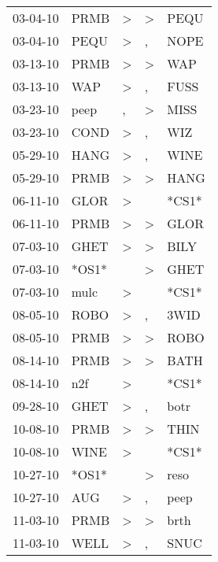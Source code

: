 \begin{supertabular}{lllll}
 03-04-10 &   PRMB &     \textgreater &     \textgreater &   PEQU \\
 03-04-10 &   PEQU &     \textgreater &                , &   NOPE \\
 03-13-10 &   PRMB &     \textgreater &     \textgreater &    WAP \\
 03-13-10 &    WAP &     \textgreater &                , &   FUSS \\
 03-23-10 &   peep &                , &     \textgreater &   MISS \\
 03-23-10 &   COND &     \textgreater &                , &    WIZ \\
 05-29-10 &   HANG &     \textgreater &                , &   WINE \\
 05-29-10 &   PRMB &     \textgreater &     \textgreater &   HANG \\
 06-11-10 &   GLOR &     \textgreater &                  &  *CS1* \\
 06-11-10 &   PRMB &     \textgreater &     \textgreater &   GLOR \\
 07-03-10 &   GHET &     \textgreater &     \textgreater &   BILY \\
 07-03-10 &  *OS1* &                  &     \textgreater &   GHET \\
 07-03-10 &   mulc &     \textgreater &                  &  *CS1* \\
 08-05-10 &   ROBO &     \textgreater &                , &   3WID \\
 08-05-10 &   PRMB &     \textgreater &     \textgreater &   ROBO \\
 08-14-10 &   PRMB &     \textgreater &     \textgreater &   BATH \\
 08-14-10 &    n2f &     \textgreater &                  &  *CS1* \\
 09-28-10 &   GHET &     \textgreater &                , &   botr \\
 10-08-10 &   PRMB &     \textgreater &     \textgreater &   THIN \\
 10-08-10 &   WINE &     \textgreater &                  &  *CS1* \\
 10-27-10 &  *OS1* &                  &     \textgreater &   reso \\
 10-27-10 &    AUG &     \textgreater &                , &   peep \\
 11-03-10 &   PRMB &     \textgreater &     \textgreater &   brth \\
 11-03-10 &   WELL &     \textgreater &                , &   SNUC \\

\end{supertabular}
